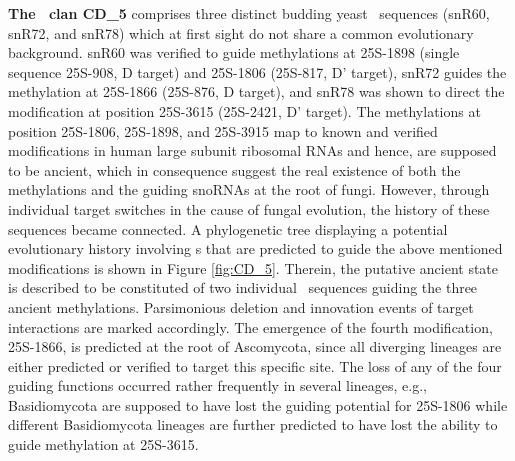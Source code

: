 \textbf{The \sno\ clan CD\_5} comprises three distinct budding yeast \sno\
sequences (snR60, snR72, and snR78) which at first sight do not share a
common evolutionary background. snR60 was verified to guide methylations at
25S-1898 (single sequence 25S-908, D target) and 25S-1806 (25S-817, D'
target), snR72 guides the methylation at 25S-1866 (25S-876, D target), and
snR78 was shown to direct the modification at position 25S-3615 (25S-2421,
D' target). The methylations at position 25S-1806, 25S-1898, and 25S-3915
map to known and verified modifications in human large subunit ribosomal
RNAs and hence, are supposed to be ancient, which in consequence suggest
the real existence of both the methylations and the guiding snoRNAs at the
root of fungi.  However, through individual target switches in the cause of
fungal evolution, the history of these sequences became connected. A
phylogenetic tree displaying a potential evolutionary history involving
\sno s that are predicted to guide the above mentioned modifications is
shown in Figure \ref{fig:CD_5}. Therein, the putative ancient state is
described to be constituted of two individual \sno\ sequences guiding the
three ancient methylations.  Parsimonious deletion and innovation events of
target interactions are marked accordingly. The emergence of the fourth
modification, 25S-1866, is predicted at the root of Ascomycota, since all
diverging lineages are either predicted or verified to target this specific
site. The loss of any of the four guiding functions occurred rather
frequently in several lineages, e.g., Basidiomycota are supposed to have
lost the guiding potential for 25S-1806 while different Basidiomycota
lineages are further predicted to have lost the ability to guide
methylation at 25S-3615.

